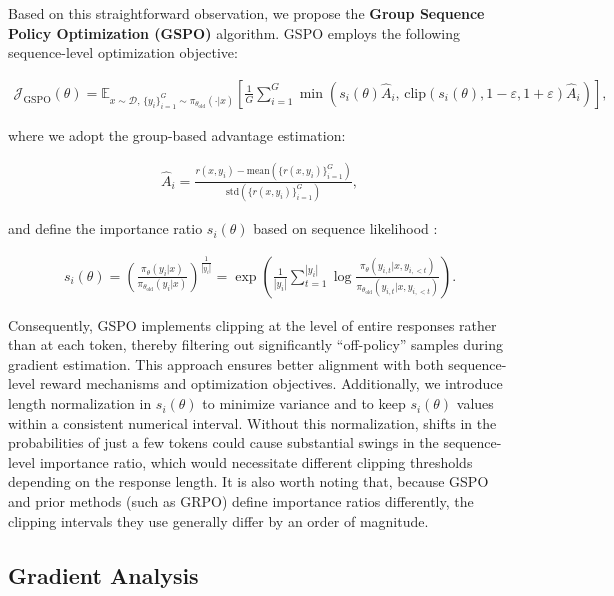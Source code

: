 Based on this straightforward observation, we propose the \textbf{Group Sequence Policy Optimization (GSPO)} algorithm. GSPO employs the following sequence-level optimization objective:

\begin{align}
\mathcal{J}_\text{GSPO} (\theta) =
\mathbb{E}_{ x \sim \mathcal{D},\, \{y_i\}_{i=1}^G \sim \pi_{\theta_\text{old}}( \cdot | x) }
\left[ 
\frac{1}{G} \sum_{i=1}^{G}
\min \left( s_{i}(\theta)  \widehat{A}_{i},  \, \mathrm{clip} \left( s_{i}(\theta), 1 - {\varepsilon}, 1 + {\varepsilon} \right) \widehat{A}_{i} \right) 
\right],
\label{equ:gspo}
\end{align}

where we adopt the group-based advantage estimation:

\begin{align}
\widehat{A}_{i} = \frac{r(x, y_i) - \mathrm{mean} \left( \{ r(x, y_i) \}_{i=1}^G \right) }{ \mathrm{std} \left( \{ r(x, y_i) \}_{i=1}^G \right) },
\end{align}

and define the importance ratio $s_{i}(\theta)$ based on sequence likelihood \citep{click}:

\begin{align}
s_{i}(\theta) = \left( \frac{ \pi_{\theta} (y_i | x) }{ \pi_{\theta_\text{old}} (y_i | x)} \right)^{\frac{1}{|y_i|}}
=
\exp \left( \frac{1}{|y_i|} \sum_{t=1}^{|y_i|} \log \frac{ \pi_{\theta} (y_{i,t} | x, y_{i,<t}) }{ \pi_{\theta_\text{old}} (y_{i,t} | x,y_{i,<t})} \right).
\end{align}

Consequently, GSPO implements clipping at the level of entire responses rather than at each token, thereby filtering out significantly “off-policy” samples during gradient estimation. This approach ensures better alignment with both sequence-level reward mechanisms and optimization objectives. Additionally, we introduce length normalization in $s_{i}(\theta)$ to minimize variance and to keep $s_{i}(\theta)$ values within a consistent numerical interval. Without this normalization, shifts in the probabilities of just a few tokens could cause substantial swings in the sequence-level importance ratio, which would necessitate different clipping thresholds depending on the response length. It is also worth noting that, because GSPO and prior methods (such as GRPO) define importance ratios differently, the clipping intervals they use generally differ by an order of magnitude.

\subsection{Gradient Analysis}
\label{subsec:gradient}

